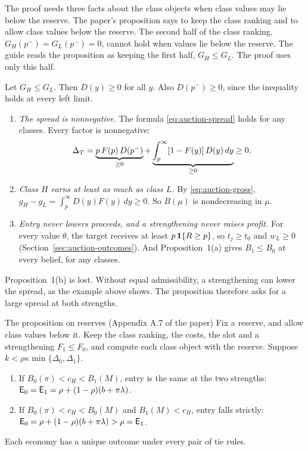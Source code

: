 The proof needs three facts about the class objects when class values may lie below the reserve. The paper's proposition
says to keep the class ranking and to allow class values below the reserve. The second half of the class ranking,
\(G_H(p^-)=G_L(p^-)=0\), cannot hold when values lie below the reserve. The guide reads the proposition as keeping the
first half, \(G_H\le G_L\). The proof uses only this half.

\begin{derivation}
Let \(G_H\le G_L\). Then \(D(y)\ge0\) for all \(y\). Also \(D(p^-)\ge0\), since the inequality holds at every left limit.
\begin{enumerate}[label=\textit{(F\arabic*)},leftmargin=*,itemsep=0.4em]
\item \emph{The spread is nonnegative.} The formula \eqref{eq:auction-spread} holds for any classes. Every factor is
nonnegative:
\[
\Delta_T=\underbrace{p\,F(p)\,D(p^-)}_{\ge0}+\underbrace{\int_p^\infty[1-F(y)]\,D(y)\,dy}_{\ge0}\ge0 .
\]
\item \emph{Class \(H\) earns at least as much as class \(L\).} By \eqref{eq:auction-gross},
\(g_H-g_L=\int_p^\infty D(y)F(y)\,dy\ge0\). So \(B(\mu)\) is nondecreasing in \(\mu\).
\item \emph{Entry never lowers proceeds, and a strengthening never raises profit.} For every value \(\theta\), the target
receives at least \(p\,\mathbf{1}\{R\ge p\}\), so \(t_j\ge t_0\) and \(w_L\ge0\) (Section~\ref{sec:auction-outcomes}). And
Proposition~1(a) gives \(B_1\le B_0\) at every belief, for any classes.
\end{enumerate}
\end{derivation}

Proposition~1(b) is lost. Without equal admissibility, a strengthening can lower the spread, as the example above shows.
The proposition therefore asks for a large spread at both strengths.

\begin{paperresult}{The proposition on reserves (Appendix A.7 of the paper)}
Fix a reserve, and allow class values below it. Keep the class ranking, the costs, the slot and a strengthening
\(F_1\le F_0\), and compute each class object with the reserve. Suppose \(k<\rho\kappa\min\{\Delta_0,\Delta_1\}\).
\begin{enumerate}[label=(\alph*),leftmargin=2em]
\item If \(B_0(\pi)<c_H<B_1(M)\), entry is the same at the two strengths:
\(\mathsf{E}_0=\mathsf{E}_1=\rho+(1-\rho)(b+\pi\lambda)\).
\item If \(B_0(\pi)<c_H<B_0(M)\) and \(B_1(M)<c_H\), entry falls strictly:
\(\mathsf{E}_0=\rho+(1-\rho)(b+\pi\lambda)>\rho=\mathsf{E}_1\).
\end{enumerate}
Each economy has a unique outcome under every pair of tie rules.
\end{paperresult}

